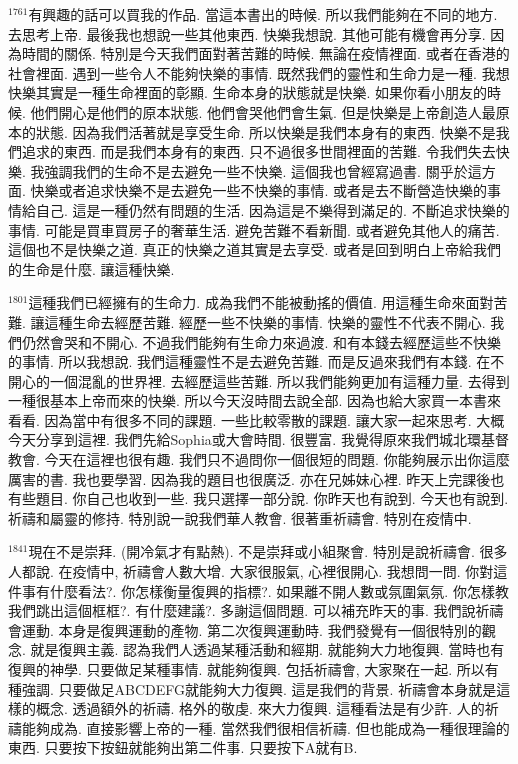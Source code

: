 \documentclass{book}
\begin{document}
$^{1761}$有興趣的話可以買我的作品.
當這本書出的時候.
所以我們能夠在不同的地方.
去思考上帝.
最後我也想說一些其他東西.
快樂我想說.
其他可能有機會再分享.
因為時間的關係.
特別是今天我們面對著苦難的時候.
無論在疫情裡面.
或者在香港的社會裡面.
遇到一些令人不能夠快樂的事情.
既然我們的靈性和生命力是一種.
我想快樂其實是一種生命裡面的彰顯.
生命本身的狀態就是快樂.
如果你看小朋友的時候.
他們開心是他們的原本狀態.
他們會哭他們會生氣.
但是快樂是上帝創造人最原本的狀態.
因為我們活著就是享受生命.
所以快樂是我們本身有的東西.
快樂不是我們追求的東西.
而是我們本身有的東西.
只不過很多世間裡面的苦難.
令我們失去快樂.
我強調我們的生命不是去避免一些不快樂.
這個我也曾經寫過書.
關乎於這方面.
快樂或者追求快樂不是去避免一些不快樂的事情.
或者是去不斷營造快樂的事情給自己.
這是一種仍然有問題的生活.
因為這是不樂得到滿足的.
不斷追求快樂的事情.
可能是買車買房子的奢華生活.
避免苦難不看新聞.
或者避免其他人的痛苦.
這個也不是快樂之道.
真正的快樂之道其實是去享受.
或者是回到明白上帝給我們的生命是什麼.
讓這種快樂.

$^{1801}$這種我們已經擁有的生命力.
成為我們不能被動搖的價值.
用這種生命來面對苦難.
讓這種生命去經歷苦難.
經歷一些不快樂的事情.
快樂的靈性不代表不開心.
我們仍然會哭和不開心.
不過我們能夠有生命力來過渡.
和有本錢去經歷這些不快樂的事情.
所以我想說.
我們這種靈性不是去避免苦難.
而是反過來我們有本錢.
在不開心的一個混亂的世界裡.
去經歷這些苦難.
所以我們能夠更加有這種力量.
去得到一種很基本上帝而來的快樂.
所以今天沒時間去說全部.
因為也給大家買一本書來看看.
因為當中有很多不同的課題.
一些比較零散的課題.
讓大家一起來思考.
大概今天分享到這裡.
我們先給Sophia或大會時間.
很豐富.
我覺得原來我們城北環基督教會.
今天在這裡也很有趣.
我們只不過問你一個很短的問題.
你能夠展示出你這麼厲害的書.
我也要學習.
因為我的題目也很廣泛.
亦在兄姊妹心裡.
昨天上完課後也有些題目.
你自己也收到一些.
我只選擇一部分說.
你昨天也有說到.
今天也有說到.
祈禱和屬靈的修持.
特別說一說我們華人教會.
很著重祈禱會.
特別在疫情中.

$^{1841}$現在不是崇拜.
(開冷氣才有點熱).
不是崇拜或小組聚會.
特別是說祈禱會.
很多人都說.
在疫情中, 祈禱會人數大增.
大家很服氣, 心裡很開心.
我想問一問.
你對這件事有什麼看法?.
你怎樣衡量復興的指標?.
如果離不開人數或氛圍氣氛.
你怎樣教我們跳出這個框框?.
有什麼建議?.
多謝這個問題.
可以補充昨天的事.
我們說祈禱會運動.
本身是復興運動的產物.
第二次復興運動時.
我們發覺有一個很特別的觀念.
就是復興主義.
認為我們人透過某種活動和經期.
就能夠大力地復興.
當時也有復興的神學.
只要做足某種事情.
就能夠復興.
包括祈禱會, 大家聚在一起.
所以有種強調.
只要做足ABCDEFG就能夠大力復興.
這是我們的背景.
祈禱會本身就是這樣的概念.
透過額外的祈禱.
格外的敬虔.
來大力復興.
這種看法是有少許.
人的祈禱能夠成為.
直接影響上帝的一種.
當然我們很相信祈禱.
但也能成為一種很理論的東西.
只要按下按鈕就能夠出第二件事.
只要按下A就有B.
\end{document}

